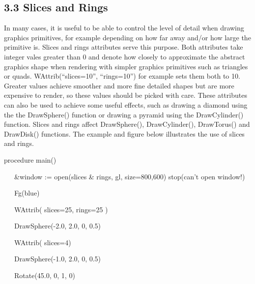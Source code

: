 \documentclass[letterpaper]{article}
\begin{document}
\subsection[3.3 Slices and Rings]{3.3 Slices and Rings}

In many cases, it is useful to be able to control the level of detail
when drawing graphics primitives, for example depending on how far
away and/or how large the primitive is. Slices and rings attributes
serve this purpose. Both attributes take integer vales greater than 0
and denote how closely to approximate the abstract graphics shape when
rendering with simpler graphics primitives such as triangles or
quads. \textsf{WAttrib(``slices=10'', ``rings=10'')} for example sets
them both to 10. Greater values achieve smoother and more fine
detailed shapes but are more expensive to render, so these values
should be picked with care. These attributes can also be used to
achieve some useful effects, such as drawing a diamond using the the
\textsf{DrawSphere()} function or drawing a pyramid
using the \textsf{DrawCylinder()} function. \textsf{Slices} and
\textsf{rings} affect \textsf{DrawSphere()}, \textsf{DrawCylinder()},
\textsf{DrawTorus()} and \textsf{DrawDisk()} functions. The
example and figure below illustrates the use of
\textsf{slices} and \textsf{rings}.

{\sffamily
procedure main()}

{\sffamily
\ \ \ \&window := open({\textquotedbl}slices \& rings{\textquotedbl}, {\textquotedbl}gl{\textquotedbl},
{\textquotedbl}size=800,600{\textquotedbl}) {\textbar} stop({\textquotedbl}can't open window!{\textquotedbl})}


\bigskip

{\sffamily
\ \ \ Fg({\textquotedbl}blue{\textquotedbl}) \ }

{\sffamily
\ \ \ WAttrib( {\textquotedbl}slices=25{\textquotedbl}, {\textquotedbl}rings=25{\textquotedbl} ) \ \ }

{\sffamily
\ \ \ DrawSphere(-2.0, 2.0, 0, 0.5)}


\bigskip

{\sffamily
\ \ \ WAttrib( {\textquotedbl}slices=4{\textquotedbl}) \ \ }

{\sffamily
\ \ \ DrawSphere(-1.0, 2.0, 0, 0.5)}


\bigskip

{\sffamily
\ \ \ Rotate(45.0, 0, 1, 0)}
\end{document}
